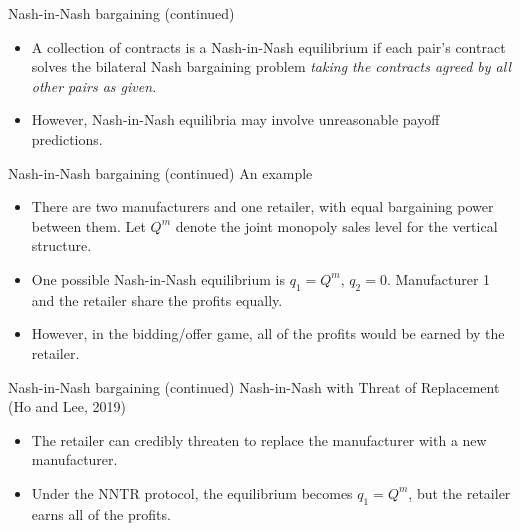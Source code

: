 \documentclass[aspectratio=169]{beamer}  %
\begin{document}
\begin{frame}{Nash-in-Nash bargaining (continued)}
    \begin{itemize}
        \item A collection of contracts is a Nash-in-Nash equilibrium if each pair's contract solves the bilateral Nash bargaining problem \textit{taking the contracts agreed by all other pairs as given.} \vspace{.2cm}
        \item However, Nash-in-Nash equilibria may involve unreasonable payoff predictions. \vspace{.2cm}
    \end{itemize}
\end{frame}



\begin{frame}{Nash-in-Nash bargaining (continued)}
    An example \vspace{.2cm}
    \begin{itemize}
        \item There are two manufacturers and one retailer, with equal bargaining power between them. Let $Q^m$ denote the joint monopoly sales level for the vertical structure. \vspace{.2cm}
        \item One possible Nash-in-Nash equilibrium is $q_1 = Q^m$, $q_2 = 0$. Manufacturer 1 and the retailer share the profits equally. \vspace{.2cm}
        \item However, in the bidding/offer game, all of the profits would be earned by the retailer. \vspace{.2cm}
    \end{itemize}
\end{frame}



\begin{frame}{Nash-in-Nash bargaining (continued)}
    Nash-in-Nash with Threat of Replacement (Ho and Lee, 2019) \vspace{.2cm}
    \begin{itemize}
        \item The retailer can credibly threaten to replace the manufacturer with a new manufacturer. \vspace{.2cm} 
        \item Under the NNTR protocol, the equilibrium becomes $q_1 = Q^m$, but the retailer earns all of the profits. \vspace{.2cm}
    \end{itemize}
\end{frame}
\end{document}
